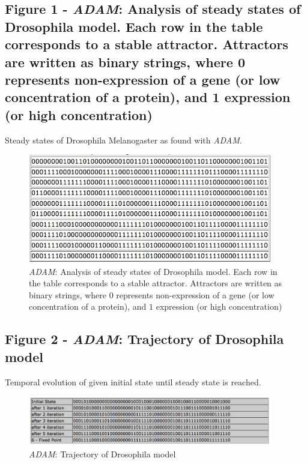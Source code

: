 \documentclass[10pt]{bmc_article}
\newenvironment{bmcformat}{\fussy\setboolean{publ}{true}}{\fussy}
\begin{document}
\begin{bmcformat}
  \subsection*{Figure 1 - {\it ADAM}: Analysis of steady states of Drosophila model. Each row in the table corresponds to a stable attractor. Attractors are written as binary strings, where 0 represents non-expression of a gene (or low concentration of a protein), and 1 expression (or high concentration)}
      Steady states of Drosophila Melanogaster as found with {\it ADAM}.

	\begin{figure}[htb]
		\centering
		\includegraphics[width=0.95\textwidth]{DroAlgOutput.jpg}

		\caption{{\it ADAM}: Analysis of steady states of Drosophila model. Each row in the table corresponds to a stable attractor. Attractors are written as binary strings, where $0$ represents non-expression of a gene (or low concentration of a protein), and $1$ expression (or high concentration)}
		\label{fig:alg}
	\end{figure}



  \subsection*{Figure 2 - {\it ADAM}: Trajectory of Drosophila model}
      Temporal evolution of given initial state until steady state is reached.
	\begin{figure}[htb]
		\centering
		\includegraphics[width=0.95\textwidth]{DroTraj.jpg}
		\caption{{\it ADAM}: Trajectory of Drosophila model}
		\label{fig:traj}
	\end{figure}
	

\end{bmcformat}
\end{document}
